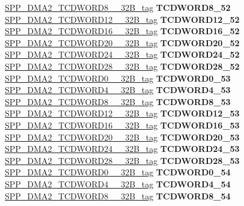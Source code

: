 \begin{DoxyCompactItemize}
\begin{tabbing}
\>\>\mbox{\hyperlink{unionSPP__DMA2__TCDWORD8____32B__tag}{SPP\_DMA2\_TCDWORD8\_\_32B\_tag}} {\bfseries TCDWORD8\_52}\\
\>\>\mbox{\hyperlink{unionSPP__DMA2__TCDWORD12____32B__tag}{SPP\_DMA2\_TCDWORD12\_\_32B\_tag}} {\bfseries TCDWORD12\_52}\\
\>\>\mbox{\hyperlink{unionSPP__DMA2__TCDWORD16____32B__tag}{SPP\_DMA2\_TCDWORD16\_\_32B\_tag}} {\bfseries TCDWORD16\_52}\\
\>\>\mbox{\hyperlink{unionSPP__DMA2__TCDWORD20____32B__tag}{SPP\_DMA2\_TCDWORD20\_\_32B\_tag}} {\bfseries TCDWORD20\_52}\\
\>\>\mbox{\hyperlink{unionSPP__DMA2__TCDWORD24____32B__tag}{SPP\_DMA2\_TCDWORD24\_\_32B\_tag}} {\bfseries TCDWORD24\_52}\\
\>\>\mbox{\hyperlink{unionSPP__DMA2__TCDWORD28____32B__tag}{SPP\_DMA2\_TCDWORD28\_\_32B\_tag}} {\bfseries TCDWORD28\_52}\\
\>\>\mbox{\hyperlink{unionSPP__DMA2__TCDWORD0____32B__tag}{SPP\_DMA2\_TCDWORD0\_\_32B\_tag}} {\bfseries TCDWORD0\_53}\\
\>\>\mbox{\hyperlink{unionSPP__DMA2__TCDWORD4____32B__tag}{SPP\_DMA2\_TCDWORD4\_\_32B\_tag}} {\bfseries TCDWORD4\_53}\\
\>\>\mbox{\hyperlink{unionSPP__DMA2__TCDWORD8____32B__tag}{SPP\_DMA2\_TCDWORD8\_\_32B\_tag}} {\bfseries TCDWORD8\_53}\\
\>\>\mbox{\hyperlink{unionSPP__DMA2__TCDWORD12____32B__tag}{SPP\_DMA2\_TCDWORD12\_\_32B\_tag}} {\bfseries TCDWORD12\_53}\\
\>\>\mbox{\hyperlink{unionSPP__DMA2__TCDWORD16____32B__tag}{SPP\_DMA2\_TCDWORD16\_\_32B\_tag}} {\bfseries TCDWORD16\_53}\\
\>\>\mbox{\hyperlink{unionSPP__DMA2__TCDWORD20____32B__tag}{SPP\_DMA2\_TCDWORD20\_\_32B\_tag}} {\bfseries TCDWORD20\_53}\\
\>\>\mbox{\hyperlink{unionSPP__DMA2__TCDWORD24____32B__tag}{SPP\_DMA2\_TCDWORD24\_\_32B\_tag}} {\bfseries TCDWORD24\_53}\\
\>\>\mbox{\hyperlink{unionSPP__DMA2__TCDWORD28____32B__tag}{SPP\_DMA2\_TCDWORD28\_\_32B\_tag}} {\bfseries TCDWORD28\_53}\\
\>\>\mbox{\hyperlink{unionSPP__DMA2__TCDWORD0____32B__tag}{SPP\_DMA2\_TCDWORD0\_\_32B\_tag}} {\bfseries TCDWORD0\_54}\\
\>\>\mbox{\hyperlink{unionSPP__DMA2__TCDWORD4____32B__tag}{SPP\_DMA2\_TCDWORD4\_\_32B\_tag}} {\bfseries TCDWORD4\_54}\\
\>\>\mbox{\hyperlink{unionSPP__DMA2__TCDWORD8____32B__tag}{SPP\_DMA2\_TCDWORD8\_\_32B\_tag}} {\bfseries TCDWORD8\_54}\\

\end{tabbing}
\end{DoxyCompactItemize}
